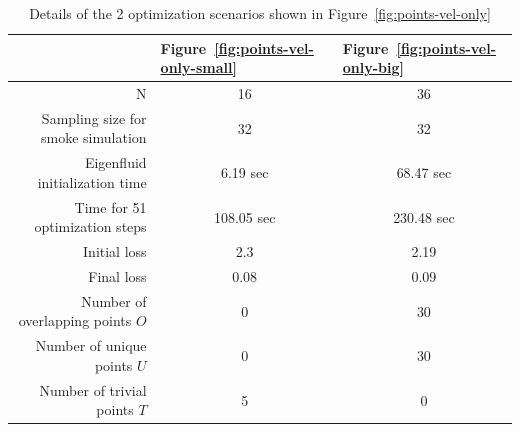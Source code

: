 \begin{table}[!h]
  \caption{Details of the 2 optimization scenarios shown in
  Figure~\ref{fig:points-vel-only}}
  \label{table:vel-optim-details}
  \centering
\begin{tabular}{r|cc}
  \multicolumn{1}{l}{}               
  & \multicolumn{1}{|l}{\textbf{Figure~\ref{fig:points-vel-only-small}}}
  & \multicolumn{1}{l}{\textbf{Figure~\ref{fig:points-vel-only-big}}}\\ \hline
N                                  & 16                                     & 36                                     \\ \hline
Sampling size for smoke simulation & 32                                     & 32                                     \\ \hline
Eigenfluid initialization time     & 6.19 sec                               & 68.47 sec                              \\ \hline
Time for 51 optimization steps     & 108.05 sec                             & 230.48 sec                             \\ \hline
Initial loss                       & 2.3                                    & 2.19                                   \\ \hline
Final loss                         & 0.08                                   & 0.09                                   \\ \hline
Number of overlapping points $O$                                  & 0                                      & 30                                     \\ \hline
Number of unique points $U$                                  & 0                                      & 30                                     \\ \hline
Number of trivial points $T$                                  & 5                                      & 0                                      \\ \hline
\end{tabular}
\end{table}
